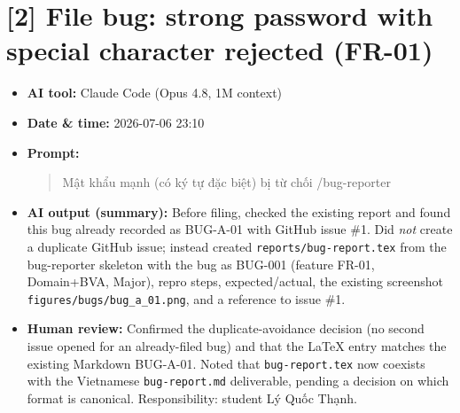 \documentclass{article}
\begin{document}
\section*{[2] File bug: strong password with special character rejected (FR-01)}
\begin{itemize}[leftmargin=*]
  \item \textbf{AI tool:} Claude Code (Opus 4.8, 1M context)
  \item \textbf{Date \& time:} 2026-07-06 23:10
  \item \textbf{Prompt:} \begin{quote}Mật khẩu mạnh (có ký tự đặc biệt) bị từ chối /bug-reporter\end{quote}
  \item \textbf{AI output (summary):} Before filing, checked the existing report and found
        this bug already recorded as BUG-A-01 with GitHub issue \#1. Did \emph{not} create a
        duplicate GitHub issue; instead created \texttt{reports/bug-report.tex} from the
        bug-reporter skeleton with the bug as BUG-001 (feature FR-01, Domain+BVA, Major),
        repro steps, expected/actual, the existing screenshot
        \texttt{figures/bugs/bug\_a\_01.png}, and a reference to issue \#1.
  \item \textbf{Human review:} Confirmed the duplicate-avoidance decision (no second issue
        opened for an already-filed bug) and that the LaTeX entry matches the existing
        Markdown BUG-A-01. Noted that \texttt{bug-report.tex} now coexists with the
        Vietnamese \texttt{bug-report.md} deliverable, pending a decision on which format
        is canonical. Responsibility: student Lý Quốc Thạnh.
\end{itemize}
\end{document}
